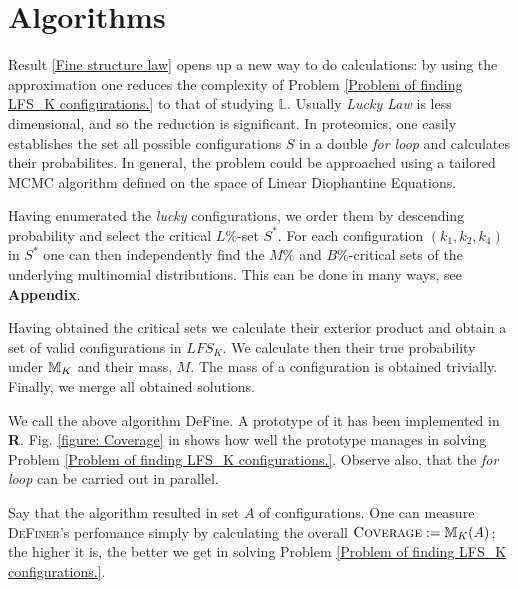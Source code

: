 \section{Algorithms}

Result \ref{Fine structure law} opens up a new way to do calculations: by using the approximation one reduces the complexity of Problem \ref{Problem of finding LFS_K configurations.} to that of studying $\mathbb{L}$. Usually {\it Lucky Law} is less dimensional, and so the reduction is significant. In proteomics, one easily establishes the set all possible configurations $S$ in a double {\it for loop} and calculates their probabilites. In general, the problem could be approached using a tailored MCMC algorithm defined on the space of Linear Diophantine Equations.   
	
Having enumerated the {\it lucky} configurations, we order them by descending probability and select the critical $L\%$-set $S^*$. For each configuration $(k_1, k_2, k_4)$ in $S^*$ one can then independently find the $M\%$ and $B\%$-critical sets of the underlying multinomial distributions. This can be done in many ways, see \textbf{Appendix}.


Having obtained the critical sets we calculate their exterior product and obtain a set of valid configurations in $LFS_K$. We calculate then their true probability under $\mathbb{M}_K$ and their mass, $M$. The mass of a configuration is obtained trivially.  Finally, we merge all obtained solutions.

We call the above algorithm {\sc DeFine}. A prototype of it has been implemented in \textbf{R}.	Fig. \ref{figure: Coverage} in  shows how well the prototype manages in solving Problem \ref{Problem of finding LFS_K configurations.}. Observe also, that the {\it for loop} can be carried out in parallel.

Say that the algorithm resulted in set $A$ of configurations. One can measure \textsc{DeFiner}'s perfomance simply by calculating the overall $\textsc{Coverage} := \mathbb{M}_K(A)$; the higher it is, the better we get in solving Problem \ref{Problem of finding LFS_K configurations.}.



